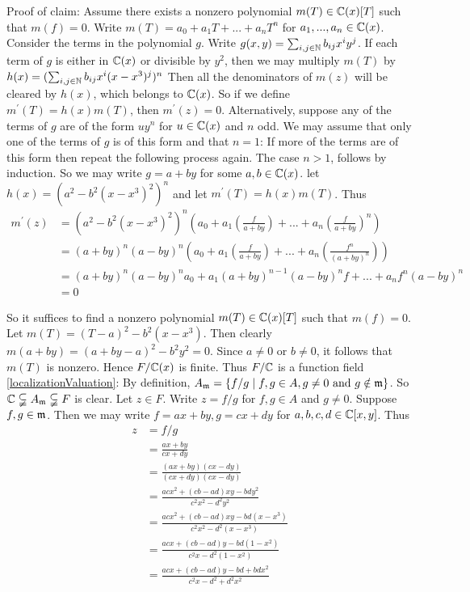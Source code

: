 \begin{solution}
	Proof of claim:
	Assume there exists a nonzero polynomial $m(T) \in \mathbb{C}(x)[T]$ 
	such that $m(f) = 0$. Write $m(T) = a_0 + a_1T + ... + a_nT^n$ 
	for $a_1,...,a_n \in \mathbb{C}(x)$. Consider the terms in the polynomial $g$.
	Write $g(x,y) = \sum_{i,j\in \mathbb{N} } b_{ij} x^iy^j$. 
	If each term of $g$ is either in $\mathbb{C}(x)$ or divisible by $y^2$,
	then we may multiply $m(T)$ by $h(x) = (\sum_{i,j\in \mathbb{N} } b_{ij} x^i(x-x^3)^j)^n$
	Then all the denominators of $m(z)$ will be cleared by $h(x)$, which 
	belongs to $\mathbb{C}(x)$. So if we define $m^{\prime}(T) = h(x)m(T)$,
	then $m^{\prime} (z) = 0$. Alternatively, suppose any of the terms
	of $g$ are of the form $uy^n$ for $u\in \mathbb{C}(x)$ and $n$ odd.
	We may assume that only one of the terms of $g$ is of this form 
	and that $n = 1$: If more of the terms are of this form then 
	repeat the following process again. 
	The case $n > 1 $, follows by induction. So we may write
	$g = a + by$ for some $a,b \in \mathbb{C}(x)$. let $h(x) = (a^2 - b^2(x-x^3)^2)^n$ and 
	let $m^{\prime}(T) = h(x)m(T)$. 
	Thus
	\begin{align*}
	m^{\prime}(z) &= (a^2 - b^2(x-x^3)^2)^n(a_0 + a_1(\frac{f}{a+by}) + ... + a_n(\frac{f}{a+by})^n) \\
	&= (a+by)^n(a-by)^n (a_0 + a_1(\frac{f}{a+by}) + ... + a_n(\frac{f^n}{(a+by)^n})) \\
	&= (a+by)^n(a-by)^na_0 + a_1(a+by)^{n-1}(a-by)^nf + ... + a_nf^n(a-by)^n \\
	&= 0  
	\end{align*}

	So it suffices to find a nonzero polynomial $m(T) \in \mathbb{C} (x)[T]$
	such that $m(f) = 0$. Let $m(T) = (T-a)^{2} - b^2(x-x^3)$. Then 
	clearly $m(a+by) = (a+by - a)^2 - b^2y^2 = 0$. Since $a \neq 0 $ 
	or $b \neq 0$, it follows that $m(T)$ is nonzero. Hence
	$F/\mathbb{C}(x)$ is finite. Thus $F/\mathbb{C}$ is a function field \\

	\eqref{localizationValuation}: By definition, 
	$A_{\mathfrak{m}} = \lbrace f/g \mid f,g \in A , g \neq 0 \text{ and } g \notin \mathfrak{m} \rbrace $.
	So $\mathbb{C} \subsetneqq A_{\mathfrak{m}} \subsetneqq F$ is clear. Let $z \in F$. 
	Write $z = f/g$ for $f,g \in A$ and $g \neq 0$. Suppose $f,g \in \mathfrak{m}$. 
	Then we may write $f = ax+by,g = cx + dy$ for $a,b,c,d \in \mathbb{C}[x,y]$.
	Thus
	\begin{align*}
	z &= f/g \\
	&= \frac{ax+by}{cx + dy} \\
	&= \frac{(ax+by)(cx - dy)}{(cx + dy)(cx - dy)} \\
	&= \frac{acx^2 + (cb-ad)xy - bdy^2}{c^2x^2 -d^2y^2} \\
	&= \frac{acx^2 + (cb-ad)xy - bd(x-x^3)}{c^2x^2 -d^2(x-x^3)} \\
	&= \frac{acx + (cb-ad)y - bd(1-x^2)}{c^2x -d^2(1-x^2)} \\
	&= \frac{acx + (cb-ad)y - bd + bdx^2}{c^2x -d^2 + d^2x^2} 
	\end{align*}


\end{solution}
